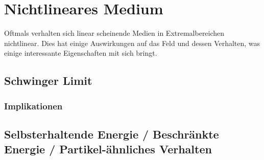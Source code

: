 %
%
%
%
\section{Nichtlineares Medium
\label{particles:section:nichtlinear}}
Oftmals verhalten sich linear scheinende Medien in Extremalbereichen nichtlinear.
Dies hat einige Auswirkungen auf das Feld und dessen Verhalten, 
was einige interessante Eigenschaften mit sich bringt. 


\subsection{Schwinger Limit}


\subsubsection{Implikationen} %


\subsection{Selbsterhaltende Energie / Beschränkte Energie / Partikel-ähnliches Verhalten} %



